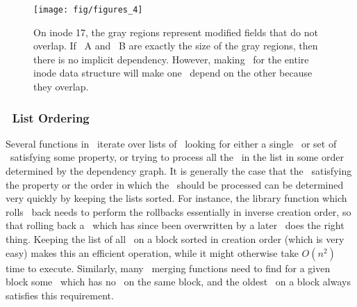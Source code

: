 \begin{figure}[htb]
  \centering
  \texttt{[image: fig/figures\_4]}
  \caption{\label{fig:overlap} On inode 17, the gray regions represent
  modified fields that do not overlap. If \chdesc\ A and \chdesc\ B are
  exactly the size of the gray regions, then there is no implicit dependency.
  However, making \chdescs\ for the entire inode data structure will make
  one \chdesc\ depend on the other because they overlap.}
\end{figure}

\subsubsection{\ChDesc\ List Ordering}
Several functions in \Kudos\ iterate over lists of \chdescs\ looking for either
a single \chdesc\ or set of \chdescs\ satisfying some property, or trying to
process all the \chdescs\ in the list in some order determined by the dependency
graph. It is generally the case that the \chdescs\ satisfying the property or
the order in which the \chdescs\ should be processed can be determined very
quickly by keeping the lists sorted. For instance, the library function which
rolls \chdescs\ back needs to perform the rollbacks essentially in inverse
creation order, so that rolling back a \chdesc\ which has since been overwritten
by a later \chdesc\ does the right thing. Keeping the list of all \chdescs\ on a
block sorted in creation order (which is very easy) makes this an efficient
operation, while it might otherwise take $O(n^2)$ time to execute. Similarly,
many \chdesc\ merging functions need to find for a given block some \chdesc\
which has no \befores\ on the same block, and the oldest \chdesc\ on a block
always satisfies this requirement.
